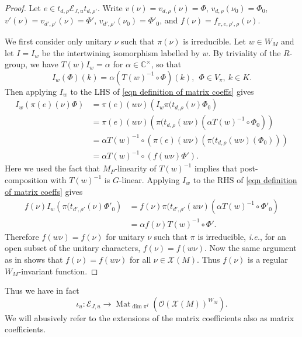 \documentclass[10pt]{article}
\DeclareMathOperator{\Mat}{Mat}
\newcommand{\X}{\mathcal{X}}
\newcommand{\Ee}{\mathcal{E}}
\newcommand{\C}{\mathbb{C}}
\newcommand{\Oo}{\mathcal{O}}
\theoremstyle{definition}
\theoremstyle{remark}
\begin{document}
\begin{proof}
Let $e\in t_{d,\rho}\Ee_{J,u}t_{d,\rho'}$. Write $v(\nu)=v_{d,\rho}(\nu)=\Phi$, 
$v_{d,\rho}(\nu_0)=\Phi_0$, $v'(\nu)=v_{d',\rho'}(\nu)=\Phi'$, $v_{d',\rho'}(\nu_0)=\Phi'_0$, and $f(\nu)=f_{\pi,e,\rho',\rho}(\nu)$.

We first consider only unitary $\nu$ such that $\pi(\nu)$ is 
irreducible. Let $w\in W_M$ and let $I=I_w$ be the intertwining isomorphism 
labelled by $w$. By triviality of the $R$-group, we have $T(w)I_w=\alpha$
for $\alpha\in\C^\times$, so that 
%
\[
I_w(\Phi)(k)=\alpha \left(T(w)^{-1}\circ \Phi\right)(k),~~\Phi\in V_\pi,~k\in K.
\]
%
Then applying $I_w$ to the LHS of \eqref{eqn definition of matrix coeffs} gives
%
\begin{align*}
I_w\left(\pi(e)(\nu)\Phi\right)
&=
\pi(e)(w\nu)\left(I_w\pi(t_{d,\rho}(\nu)\Phi_0\right)
\\
&=
\pi(e)(w\nu)\left(\pi(t_{d,\rho}(w\nu)\left(\alpha T(w)^{-1}\circ \Phi_0\right)\right)
\\
&=
\alpha T(w)^{-1}\circ\left(\pi(e)(w\nu)\left(\pi(t_{d,\rho}(w\nu)\left(\Phi_0\right)\right)\right)\\
&=
\alpha T(w)^{-1}\circ\left(f(w\nu)\Phi'\right).
\end{align*}
%
Here we used the fact that $M_P$-linearity of $T(w)^{-1}$ implies that post-composition with $T(w)^{-1}$ is 
$G$-linear. Applying $I_w$ to the RHS of \eqref{eqn definition of matrix coeffs} gives
%
\begin{align*}
f(\nu)I_w\left(\pi(t_{d',\rho'}(\nu)\Phi'_0\right)
&=f(\nu)\pi(t_{d',\rho'}(w\nu)\left(\alpha T(w)^{-1}\circ \Phi'_0\right)
\\
&=
\alpha f(\nu) T(w)^{-1}\circ \Phi'.
\end{align*}
%
Therefore $f(w\nu)=f(\nu)$ for unitary $\nu$ such that $\pi$ is irreducible, \textit{i.e.}, for an open 
subset of the unitary characters, $f(\nu)=f(w\nu)$. Now the 
same argument as in \cite[Lemma 4]{Plancherel} shows that $f(\nu)=f(w\nu)$ for 
all $\nu\in \X(M)$. Thus $f(\nu)$ is a regular $W_M$-invariant function.
\end{proof}
%
Thus we have in fact
%
\begin{equation}
\label{eqn EJu to single Mat definition}
\iota_u\colon\mathcal{E}_{J,u}\to\Mat_{\dim\pi^I}\left(\Oo(\X(M))^{W_M}\right).
\end{equation}
%
We will abusively refer to the extensions of the matrix coefficients also as matrix coefficients.
\end{document}
